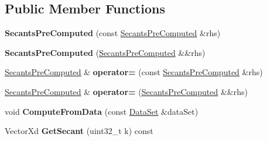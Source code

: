 \subsection*{Public Member Functions}
\begin{DoxyCompactItemize}
\item 
\hypertarget{struct_d_r_d_s_p_1_1_secants_pre_computed_a11e28de45102b068cf71cb2c9d6fca68}{{\bfseries Secants\-Pre\-Computed} (const \hyperlink{struct_d_r_d_s_p_1_1_secants_pre_computed}{Secants\-Pre\-Computed} \&rhs)}\label{struct_d_r_d_s_p_1_1_secants_pre_computed_a11e28de45102b068cf71cb2c9d6fca68}

\item 
\hypertarget{struct_d_r_d_s_p_1_1_secants_pre_computed_a9a23b0c9136fe8990a00be33787cb0f5}{{\bfseries Secants\-Pre\-Computed} (\hyperlink{struct_d_r_d_s_p_1_1_secants_pre_computed}{Secants\-Pre\-Computed} \&\&rhs)}\label{struct_d_r_d_s_p_1_1_secants_pre_computed_a9a23b0c9136fe8990a00be33787cb0f5}

\item 
\hypertarget{struct_d_r_d_s_p_1_1_secants_pre_computed_a7ca923d368f7131f8628eaf2bcf0d715}{\hyperlink{struct_d_r_d_s_p_1_1_secants_pre_computed}{Secants\-Pre\-Computed} \& {\bfseries operator=} (const \hyperlink{struct_d_r_d_s_p_1_1_secants_pre_computed}{Secants\-Pre\-Computed} \&rhs)}\label{struct_d_r_d_s_p_1_1_secants_pre_computed_a7ca923d368f7131f8628eaf2bcf0d715}

\item 
\hypertarget{struct_d_r_d_s_p_1_1_secants_pre_computed_afd36138af8143a3daa493d988938e784}{\hyperlink{struct_d_r_d_s_p_1_1_secants_pre_computed}{Secants\-Pre\-Computed} \& {\bfseries operator=} (\hyperlink{struct_d_r_d_s_p_1_1_secants_pre_computed}{Secants\-Pre\-Computed} \&\&rhs)}\label{struct_d_r_d_s_p_1_1_secants_pre_computed_afd36138af8143a3daa493d988938e784}

\item 
\hypertarget{struct_d_r_d_s_p_1_1_secants_pre_computed_a07644fb406546e3e6f5adbebd472a968}{void {\bfseries Compute\-From\-Data} (const \hyperlink{struct_d_r_d_s_p_1_1_data_set}{Data\-Set} \&data\-Set)}\label{struct_d_r_d_s_p_1_1_secants_pre_computed_a07644fb406546e3e6f5adbebd472a968}

\item 
\hypertarget{struct_d_r_d_s_p_1_1_secants_pre_computed_a6b9de4610d5af4f02ab7b0c6fc326ed8}{Vector\-Xd {\bfseries Get\-Secant} (uint32\-\_\-t k) const }\label{struct_d_r_d_s_p_1_1_secants_pre_computed_a6b9de4610d5af4f02ab7b0c6fc326ed8}

\end{DoxyCompactItemize}
